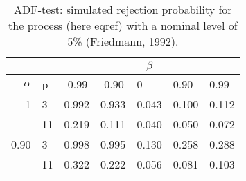 \documentclass[12pt,a4paper,oneside, openany]{article}
\begin{document}
\begin{table}[ht]
\centering
\begin{tabular}{rl|lllll}
  \hline
  \hline
    &          & \multicolumn{5}{c}{$\beta$} \\ 
  \hline
	$\alpha$ & p  & -0.99 & -0.90 & 0 & 0.90 & 0.99 \\ 
  1 & 3  & 0.992 & 0.933 & 0.043 & 0.100 & 0.112 \\ 
    & 11 & 0.219 & 0.111 & 0.040 & 0.050 & 0.072 \\ 
  \hline
  0.90 & 3 & 0.998 & 0.995 & 0.130 & 0.258 & 0.288 \\ 
       & 11 & 0.322 & 0.222 & 0.056 & 0.081 & 0.103 \\ 
  \hline
  \hline
\end{tabular}
\caption{ADF-test: simulated rejection probability for the process (here eqref)
with a nominal level of 5\% (Friedmann, 1992).} %
\end{table}
\end{document}
